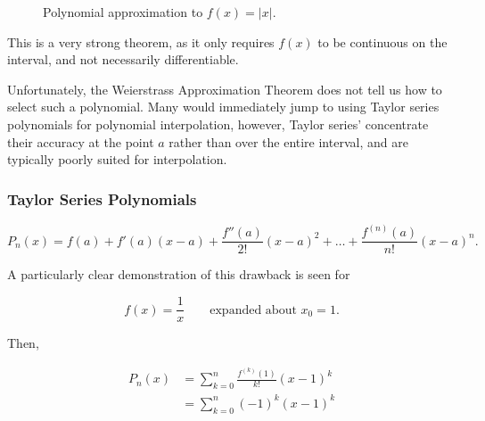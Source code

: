 \documentclass[12pt]{article}
\begin{document}
\begin{figure}[h]
    \centering
    \caption{Polynomial approximation to $f(x) = |x|$.}
\end{figure}

This is a very strong theorem, as it only requires $f(x)$ to be continuous on 
the interval, and not necessarily differentiable.

Unfortunately, the Weierstrass Approximation Theorem does not tell us how to 
select such a polynomial. Many would immediately jump to using Taylor series
polynomials for polynomial interpolation, however, Taylor series' concentrate
their accuracy at the point $a$ rather than over the entire interval, and are
typically poorly suited for interpolation.

\subsubsection{Taylor Series Polynomials}

\[
P_n(x) = f(a) + f'(a)(x-a) + \frac{f''(a)}{2!}(x-a)^2 + \dots + \frac{f^{(n)}(a)}{n!}(x-a)^n
.\]

A particularly clear demonstration of this drawback is seen for

\[
f(x) = \frac{1}{x} \qquad \text{expanded about } x_0 = 1
.\]

Then,

\begin{align*}
  P_n(x) &= \sum_{k=0}^n \frac{f^{(k)}(1)}{k!}(x-1)^k\\
         &= \sum_{k=0}^n (-1)^k(x-1)^k \\
\end{align*}
\end{document}
